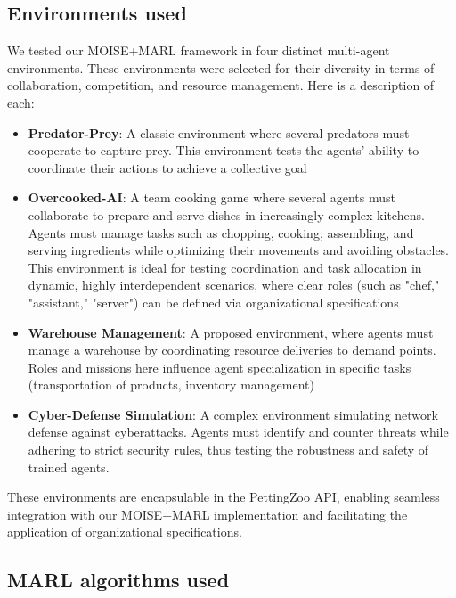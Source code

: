 \documentclass[conference]{IEEEtran}
\begin{document}
\subsection{Environments used}

We tested our MOISE+MARL framework in four distinct multi-agent environments. These environments were selected for their diversity in terms of collaboration, competition, and resource management. Here is a description of each:

\begin{itemize}
    \item \textbf{Predator-Prey}: A classic environment where several predators must cooperate to capture prey. This environment tests the agents' ability to coordinate their actions to achieve a collective goal\cite{lowe2017multi}

    \item \textbf{Overcooked-AI}: A team cooking game where several agents must collaborate to prepare and serve dishes in increasingly complex kitchens\cite{overcookedai}. Agents must manage tasks such as chopping, cooking, assembling, and serving ingredients while optimizing their movements and avoiding obstacles. This environment is ideal for testing coordination and task allocation in dynamic, highly interdependent scenarios, where clear roles (such as "chef," "assistant," "server") can be defined via organizational specifications
    
    \item \textbf{Warehouse Management}: A proposed environment, where agents must manage a warehouse by coordinating resource deliveries to demand points. Roles and missions here influence agent specialization in specific tasks (transportation of products, inventory management)
    
    \item \textbf{Cyber-Defense Simulation}: A complex environment simulating network defense against cyberattacks. Agents must identify and counter threats while adhering to strict security rules, thus testing the robustness and safety of trained agents\cite{Maxwell2021}.
\end{itemize}

These environments are encapsulable in the PettingZoo API, enabling seamless integration with our MOISE+MARL implementation and facilitating the application of organizational specifications.

\subsection{MARL algorithms used}
\end{document}
